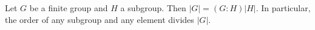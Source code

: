Let $G$ be a finite group and $H$ a subgroup. Then $|G| = (G:H)|H|$. In particular, the order of any subgroup and any element divides $|G|$.
